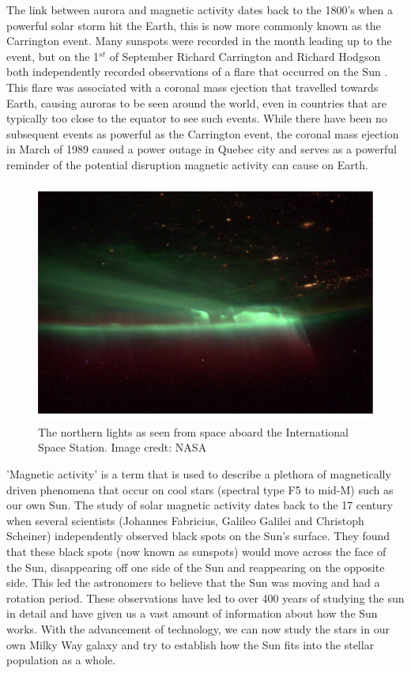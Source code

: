 The link between aurora and magnetic activity dates back to the 1800's when a powerful solar storm hit the Earth, this is now more commonly known as the Carrington event. Many sunspots were recorded in the month leading up to the event, but on the 1$^{st}$ of September Richard Carrington and Richard Hodgson both independently recorded observations of a flare that occurred on the Sun \citep{Carrington_1858,Hodgson_1859}. This flare was associated with a coronal mass ejection that travelled towards Earth, causing auroras to be seen around the world, even in countries that are typically too close to the equator to see such events. While there have been no subsequent events as powerful as the Carrington event, the coronal mass ejection in March of 1989 caused a power outage in Quebec city and serves as a powerful reminder of the potential disruption magnetic activity can cause on Earth. 

\begin{figure}
    \centering
    \includegraphics[scale=0.4]{Figures/1-Introduction/northern_lights_iss_20131009.pdf}
    \caption[Image of the northern lights as seen from space]{The northern lights as seen from space aboard the International Space Station. Image credt: NASA}
    \label{fig:aurora_from_space}
\end{figure}

'Magnetic activity' is a term that is used to describe a plethora of magnetically driven phenomena that occur on cool stars (spectral type F5 to mid-M) such as our own Sun. The study of solar magnetic activity dates back to the 17 century when several scientists (Johannes Fabricius, Galileo Galilei and Christoph Scheiner) independently observed black spots on the Sun's surface. They found that these black spots (now known as sunspots) would move across the face of the Sun, disappearing off one side of the Sun and reappearing on the opposite side. This led the astronomers to believe that the Sun was moving and had a rotation period. These observations have led to over 400 years of studying the sun in detail and have given us a vast amount of information about how the Sun works. With the advancement of technology, we can now study the stars in our own Milky Way galaxy and try to establish how the Sun fits into the stellar population as a whole.

